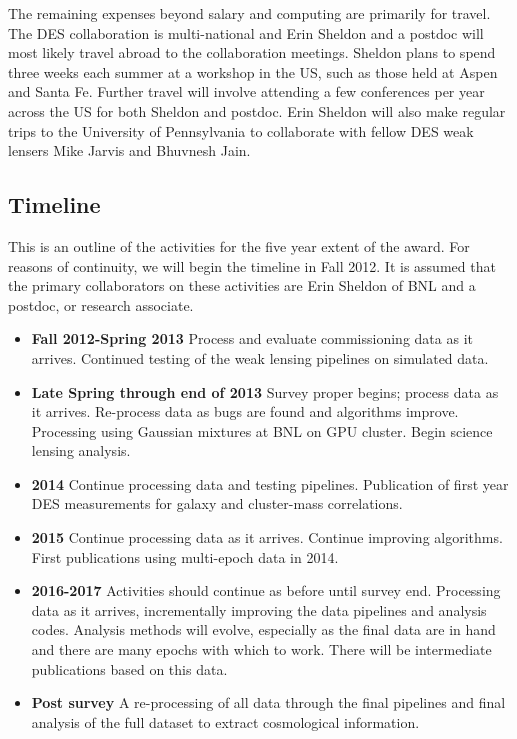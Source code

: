 \documentclass[12pt]{article}
\begin{document}
The remaining expenses beyond salary and computing are primarily for travel.
The DES collaboration is multi-national and Erin Sheldon and a postdoc will
most likely travel abroad to the collaboration meetings.  Sheldon plans to
spend three weeks each summer at a workshop in the US, such as those held at
Aspen and Santa Fe.  Further travel will involve attending a few conferences
per year across the US for both Sheldon and postdoc.  Erin Sheldon will also
make regular trips to the University of Pennsylvania to collaborate with fellow
DES weak lensers Mike Jarvis and Bhuvnesh Jain.

\clearpage
\newpage
\subsection{Timeline} \label{sec:timeline}

This is an outline of the activities for the five year extent of the award.
For reasons of continuity, we will begin the timeline in Fall 2012.  It is
assumed that the primary collaborators on these activities are Erin Sheldon of
BNL and a postdoc, or research associate.

\begin{itemize}

\item {\bf Fall 2012-Spring 2013} Process and evaluate commissioning data as it
    arrives.  Continued testing of the weak lensing pipelines on simulated
    data.

\item {\bf Late Spring through end of 2013} Survey proper begins; process data
    as it arrives.  Re-process data as bugs are found and algorithms improve.
    Processing using Gaussian mixtures at BNL on GPU cluster.  Begin science
    lensing analysis.

\item {\bf 2014} Continue processing data and testing pipelines.  Publication
    of first year DES measurements for galaxy and cluster-mass correlations.

\item {\bf 2015} Continue processing data as it arrives.  Continue improving
    algorithms.   First publications using multi-epoch data in 2014.

\item {\bf 2016-2017}  Activities should continue as before until survey end.
    Processing data as it arrives, incrementally improving the data pipelines
    and analysis codes.  Analysis methods will evolve, especially as the final
    data are in hand and there are many epochs with which to work.   There will
    be intermediate publications based on this data.

\item {\bf Post survey} A re-processing of all data through the final pipelines
    and final analysis of the full dataset to extract cosmological information.


\end{itemize}
\end{document}
